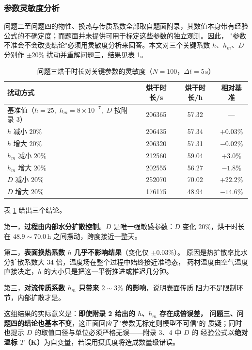 \documentclass[12pt,a4paper,fontset=none]{ctexart}
\begin{document}
\subsubsection{参数灵敏度分析}
\label{sec:sensitivity}

问题二至问题四的物性、换热与传质系数全部取自题面附录，其数值本身带有经验
公式的不确定度；而题面并未提供可用于标定这些参数的独立观测。因此，
"参数不准会不会改变结论"必须用灵敏度分析来回答。本文对三个关键系数
$h$、$h_m$、$D$ 分别作 $\pm20\%$ 扰动并重解问题三，结果见表
\ref{tab:sens}。

\begin{table}[htbp]
  \centering
  \caption{问题三烘干时长对关键参数的灵敏度（$N=100$，$\Delta t=5$\,s）}
  \label{tab:sens}
  \small
  \begin{tabular}{lccc}
    \toprule
    扰动方式 & 烘干时长/s & 烘干时长/h & 相对基准 \\
    \midrule
    基准值（$h=25$,\ $h_m=8\times10^{-7}$,\ $D$ 按附录 3） & 206365
      & 57.32 & --- \\
    $h$ 减小 $20\%$ & 206435 & 57.34 & $+0.03\%$ \\
    $h$ 增大 $20\%$ & 206320 & 57.31 & $-0.02\%$ \\
    $h_m$ 减小 $20\%$ & 212560 & 59.04 & $+3.0\%$ \\
    $h_m$ 增大 $20\%$ & 202555 & 56.27 & $-1.8\%$ \\
    $D$ 减小 $20\%$ & 252070 & 70.02 & $+22.2\%$ \\
    $D$ 增大 $20\%$ & 176175 & 48.94 & $-14.6\%$ \\
    \bottomrule
  \end{tabular}
\end{table}

表 \ref{tab:sens} 给出三个结论。

第一，\textbf{过程由内部水分扩散控制}。$D$ 是唯一强敏感参数：$D$ 变化
$20\%$，烘干时长在 $48.9\sim70.0$\,h 之间摆动，跨度接近一整天。

第二，\textbf{表面换热系数 $h$ 几乎不影响结果}（变化仅 $\pm0.03\%$）。
原因是热扩散率比水分扩散系数大 34 倍，温度场在整个过程中始终接近准稳态，
药材温度由空气温度直接决定，$h$ 的大小只是把这一平衡推进或推迟几分钟。

第三，\textbf{对流传质系数 $h_m$ 只带来 $2\sim3\%$ 的影响}，说明表面传质
阻力不是限制环节，内部扩散才是。

这组结果的实际意义是：\textbf{即使附录 2 给出的 $h$、$h_m$ 存在成倍误差，
问题三、问题四的结论也基本不变}，这正面回应了"参数无标定则模型不可信"的
质疑；同时也提示 $D$ 的取值口径与单位必须严格无误——附录 3、4 中 $D$ 的
经验公式以\textbf{绝对温标 $T$（K）}为自变量，若误用摄氏度将造成数量级错误。
\end{document}
